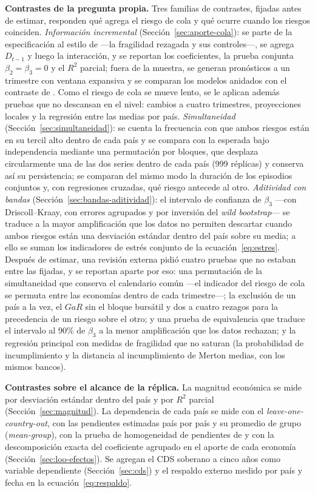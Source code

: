 \textbf{Contrastes de la pregunta propia.} Tres familias de contrastes, fijadas antes de estimar, responden qué agrega el riesgo de cola y qué ocurre cuando los riesgos coinciden. \emph{Información incremental} (Sección~\ref{sec:aporte-cola}): se parte de la especificación al estilo de \citet{Chari2024b} ---la fragilidad rezagada y sus controles---, se agrega $D_{t-1}$ y luego la interacción, y se reportan los coeficientes, la prueba conjunta $\beta_2=\beta_3=0$ y el $R^2$ parcial; fuera de la muestra, se generan pronósticos a un trimestre con ventana expansiva y se comparan los modelos anidados con el contraste de \citet{ClarkWest2007}. Como el riesgo de cola se mueve lento, se le aplican además pruebas que no descansan en el nivel: cambios a cuatro trimestres, proyecciones locales y la regresión entre las medias por país. \emph{Simultaneidad} (Sección~\ref{sec:simultaneidad}): se cuenta la frecuencia con que ambos riesgos están en su tercil alto dentro de cada país y se compara con la esperada bajo independencia mediante una permutación por bloques, que desplaza circularmente una de las dos series dentro de cada país (999 réplicas) y conserva así su persistencia; se comparan del mismo modo la duración de los episodios conjuntos y, con regresiones cruzadas, qué riesgo antecede al otro. \emph{Aditividad con bandas} (Sección~\ref{sec:bandas-aditividad}): el intervalo de confianza de $\beta_3$ ---con Driscoll--Kraay, con errores agrupados y por inversión del \textit{wild bootstrap}--- se traduce a la mayor amplificación que los datos no permiten descartar cuando ambos riesgos están una desviación estándar dentro del país sobre su media; a ello se suman los indicadores de estrés conjunto de la ecuación~\eqref{eq:estres}. Después de estimar, una revisión externa pidió cuatro pruebas que no estaban entre las fijadas, y se reportan aparte por eso: una permutación de la simultaneidad que conserva el calendario común ---el indicador del riesgo de cola se permuta entre las economías dentro de cada trimestre---; la exclusión de un país a la vez, el $GaR$ sin el bloque bursátil y dos a cuatro rezagos para la precedencia de un riesgo sobre el otro; y una prueba de equivalencia \citep{Schuirmann1987} que traduce el intervalo al 90\% de $\beta_3$ a la menor amplificación que los datos rechazan; y la regresión principal con medidas de fragilidad que no saturan (la probabilidad de incumplimiento y la distancia al incumplimiento de Merton medias, con los mismos bancos).

\textbf{Contrastes sobre el alcance de la réplica.} La magnitud económica se mide por desviación estándar dentro del país y por $R^2$ parcial (Sección~\ref{sec:magnitud}). La dependencia de cada país se mide con el \textit{leave-one-country-out}, con las pendientes estimadas país por país y su promedio de grupo (\textit{mean-group}), con la prueba de homogeneidad de pendientes de \citet{PesaranYamagata2008} y con la descomposición exacta del coeficiente agrupado en el aporte de cada economía (Sección~\ref{sec:loo-efectos}). Se agregan el CDS soberano a cinco años como variable dependiente (Sección~\ref{sec:cds}) y el respaldo externo medido por país y fecha en la ecuación~\eqref{eq:respaldo}.

